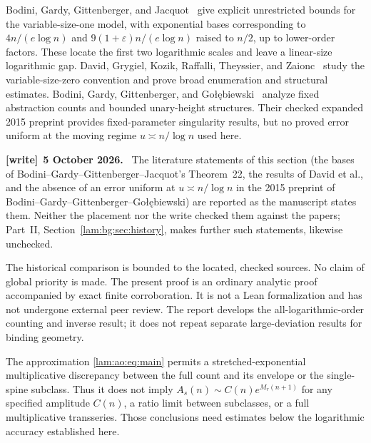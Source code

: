 \documentclass[11pt,a4paper]{article}
\numberwithin{equation}{section}
\theoremstyle{remark}
\newenvironment{writenote}[1][]{\par\smallskip\begingroup\small
 \noindent\textbf{[write]}\if\relax\detokenize{#1}\relax\else~\textbf{#1.}\fi\ }%
 {\par\endgroup\smallskip}
\begin{document}
Bodini, Gardy, Gittenberger, and Jacquot~\cite{bggj2013} give explicit unrestricted bounds for the variable-size-one model, with exponential bases corresponding to $4n/(e\log n)$ and $9(1+\varepsilon)n/(e\log n)$ raised to $n/2$, up to lower-order factors. These locate the first two logarithmic scales and leave a linear-size logarithmic gap. David, Grygiel, Kozik, Raffalli, Theyssier, and Zaionc~\cite{david2013} study the variable-size-zero convention and prove broad enumeration and structural estimates. Bodini, Gardy, Gittenberger, and Go\l\k{e}biewski~\cite{bggg2018} analyze fixed abstraction counts and bounded unary-height structures. Their checked expanded 2015 preprint provides fixed-parameter singularity results, but no proved error uniform at the moving regime $u\asymp n/\log n$ used here.
\begin{writenote}[5 October 2026]
The literature statements of this section (the bases of Bodini--Gardy--Gittenberger--Jacquot's Theorem~22, the results of David et al., and the absence of an error uniform at $u\asymp n/\log n$ in the 2015 preprint of Bodini--Gardy--Gittenberger--Go\l\k{e}biewski) are reported as the manuscript states them. Neither the placement nor the write checked them against the papers; Part~II, Section~\ref{lam:bg:sec:history}, makes further such statements, likewise unchecked.
\end{writenote}

The historical comparison is bounded to the located, checked sources. No claim of global priority is made. The present proof is an ordinary analytic proof accompanied by exact finite corroboration. It is not a Lean formalization and has not undergone external peer review. The report develops the all-logarithmic-order counting and inverse result; it does not repeat separate large-deviation results for binding geometry.

The approximation \eqref{lam:ao:eq:main} permits a stretched-exponential multiplicative discrepancy between the full count and its envelope or the single-spine subclass. Thus it does not imply $A_s(n)\sim C(n)e^{M_r(n+1)}$ for any specified amplitude $C(n)$, a ratio limit between subclasses, or a full multiplicative transseries. Those conclusions need estimates below the logarithmic accuracy established here.
\end{document}
